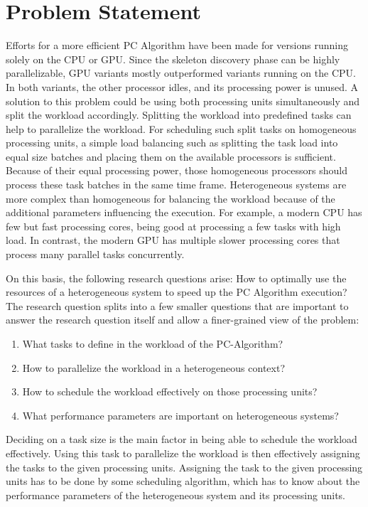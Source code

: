 \chapter{Problem Statement}
Efforts for a more efficient PC Algorithm have been made for versions running solely on the CPU or GPU. Since the skeleton discovery phase can be highly parallelizable, GPU variants mostly outperformed variants running on the CPU. In both variants, the other processor idles, and its processing power is unused. A solution to this problem could be using both processing units simultaneously and split the workload accordingly.
Splitting the workload into predefined tasks can help to parallelize the workload. For scheduling such split tasks on homogeneous processing units, a simple load balancing such as splitting the task load into equal size batches and placing them on the available processors is sufficient.
Because of their equal processing power, those homogeneous processors should process these task batches in the same time frame.
Heterogeneous systems are more complex than homogeneous for balancing the workload because of the additional parameters influencing the execution. For example, a modern CPU has few but fast processing cores, being good at processing a few tasks with high load. In contrast, the modern GPU has multiple slower processing cores that process many parallel tasks concurrently.

On this basis, the following research questions arise: How to optimally use the resources of a heterogeneous system to speed up the PC Algorithm execution?
The research question splits into a few smaller questions that are important to answer the research question itself and allow a finer-grained view of the problem:

\begin{enumerate}
  \item What tasks to define in the workload of the PC-Algorithm?
  \item How to parallelize the workload in a heterogeneous context?
  \item How to schedule the workload effectively on those processing units?
  \item What performance parameters are important on heterogeneous systems?
\end{enumerate}

Deciding on a task size is the main factor in being able to schedule the workload effectively. Using this task to parallelize the workload is then effectively assigning the tasks to the given processing units. Assigning the task to the given processing units has to be done by some scheduling algorithm, which has to know about the performance parameters of the heterogeneous system and its processing units.
